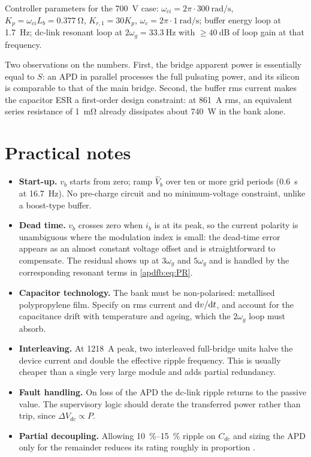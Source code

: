 Controller parameters for the \SI{700}{\volt} case:
$\omega_{ci}=2\pi\cdot\SI{300}{\radian\per\second}$,
$K_p=\omega_{ci}L_b=\SI{0.377}{\ohm}$, $K_{r,1}=30K_p$,
$\omega_c=2\pi\cdot\SI{1}{\radian\per\second}$; buffer energy loop at
\SI{1.7}{\hertz}; dc-link resonant loop at $2\omega_g=\SI{33.3}{\hertz}$ with
$\ge\SI{40}{\deci\bel}$ of loop gain at that frequency.

Two observations on the numbers. First, the bridge apparent power is essentially
equal to $S$: an APD in parallel processes the full pulsating power, and its
silicon is comparable to that of the main bridge. Second, the buffer rms current
makes the capacitor ESR a first-order design constraint: at
\SI{861}{\ampere} rms, an equivalent series resistance of \SI{1}{\milli\ohm}
already dissipates about \SI{740}{\watt} in the bank alone.

\section{Practical notes}

\begin{itemize}
\item \textbf{Start-up.} $v_b$ starts from zero; ramp $\hat V_b$ over ten or
more grid periods (\SI{0.6}{\second} at \SI{16.7}{\hertz}). No pre-charge
circuit and no minimum-voltage constraint, unlike a boost-type buffer.

\item \textbf{Dead time.} $v_b$ crosses zero when $i_b$ is at its peak, so the
current polarity is unambiguous where the modulation index is small: the
dead-time error appears as an almost constant voltage offset and is
straightforward to compensate. The residual shows up at $3\omega_g$ and
$5\omega_g$ and is handled by the corresponding resonant terms in
\eqref{apdfb:eq:PR}.

\item \textbf{Capacitor technology.} The bank must be non-polarised: metallised
polypropylene film. Specify on rms current and $\mathrm{d} v/\mathrm{d} t$, and account for
the capacitance drift with temperature and ageing, which the $2\omega_g$ loop
must absorb.

\item \textbf{Interleaving.} At \SI{1218}{\ampere} peak, two interleaved
full-bridge units halve the device current and double the effective ripple
frequency. This is usually cheaper than a single very large module and adds
partial redundancy.

\item \textbf{Fault handling.} On loss of the APD the dc-link ripple returns to
the passive value. The supervisory logic should derate the transferred power
rather than trip, since $\Delta V_{dc}\propto P$.

\item \textbf{Partial decoupling.} Allowing \SIrange{10}{15}{\percent} ripple on
$C_{dc}$ and sizing the APD only for the remainder reduces its rating roughly in
proportion \cite{neumayr2021partial}.
\end{itemize}

